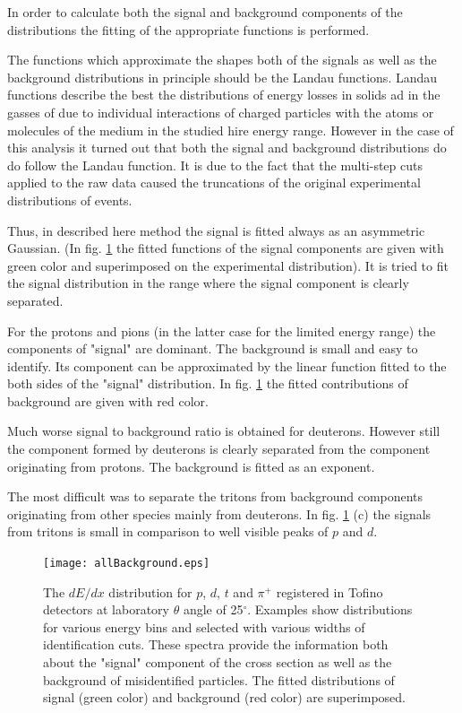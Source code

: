 In order to calculate both the signal and background components 
of the distributions the fitting of the appropriate functions is performed. 

The functions which approximate the shapes both of the signals as well as 
the background distributions in principle should be the Landau functions. 
Landau functions describe the best the distributions of energy losses 
in solids ad in the gasses of due to individual interactions of charged particles 
with the atoms or molecules of the medium in the studied hire energy range. 
However in the case of this analysis it turned out that both the signal and background 
distributions do do follow the Landau function. 
It is due to the fact that the multi-step cuts applied to the raw data caused 
the truncations of the original experimental distributions of events.  

Thus, in described here method the signal is fitted always as an asymmetric Gaussian. 
(In fig. \ref{backg} the fitted functions 
of the signal components are given with green color and superimposed on the experimental distribution). 
It is tried to fit the signal distribution in the range where the signal component 
is clearly separated.

For the protons and pions (in the latter case for the limited energy range) 
the components of "signal" are dominant. 
The background is small and easy to identify. 
Its component can be approximated by the linear function fitted 
to the both sides of the "signal" distribution. 
In fig. \ref{backg} the fitted contributions of background are given with red color.

Much worse signal to background ratio is obtained for deuterons. 
However still the component formed by deuterons is clearly 
separated from the component originating from protons. The background is fitted as an exponent.

The most difficult was to separate the tritons from background components originating 
from other species mainly from deuterons. In fig. \ref{backg} (c) the signals from tritons is small 
in comparison to well visible peaks of $p$ and $d$.

\begin{figure}[!h]
		\centering
		\texttt{[image: allBackground.eps]}
		\caption{The $dE/dx$ distribution for $p$, $d$, $t$ and $\pi^+$ registered in Tofino detectors 
                at laboratory $\theta$ angle of 25$^{\circ}$. Examples show distributions for various energy bins 
                and selected with various widths of identification cuts. 
                These spectra provide the information both about the "signal" component of the cross section 
                as well as the background of misidentified particles. The fitted distributions of signal (green color) and 
                background (red color) are superimposed.}
		\label{backg}
\end{figure}  


